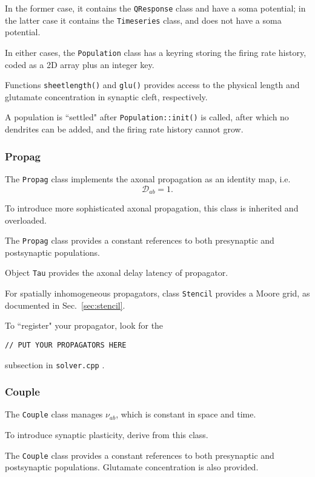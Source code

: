 \documentclass[12pt,a4paper]{article}
\newcommand{\type}[1]{ {\small\small\tt #1} }
\begin{document}
In the former case, it contains the \type{QResponse} class and have a soma potential; in the latter case it contains the \type{Timeseries} class, and does not have a soma potential.

In either cases, the \type{Population} class has a keyring storing the firing rate history, coded as a 2D array plus an integer key.

Functions \type{sheetlength()} and \type{glu()} provides access to the physical length and glutamate concentration in synaptic cleft, respectively.

A population is ``settled" after \type{Population::init()} is called, after which no dendrites can be added, and the firing rate history cannot grow.

\subsubsection{Propag}
\label{sec:propag}

The \type{Propag} class implements the axonal propagation as an identity map, i.e.
\[ \mathcal{D}_{ab} = 1. \]

To introduce more sophisticated axonal propagation, this class is inherited and overloaded.

The \type{Propag} class provides a constant references to both presynaptic and postsynaptic populations.

Object \type{Tau} provides the axonal delay latency of propagator.

For spatially inhomogeneous propagators, class \type{Stencil} provides a Moore grid, as documented in Sec.~\ref{sec:stencil}.

To ``register" your propagator, look for the
\begin{lstlisting}
// PUT YOUR PROPAGATORS HERE
\end{lstlisting}
subsection in \type{solver.cpp}.

\subsubsection{Couple}
\label{sec:couple}

The \type{Couple} class manages \(\nu_{ab}\), which is constant in space and time.

To introduce synaptic plasticity, derive from this class.

The \type{Couple} class provides a constant references to both presynaptic and postsynaptic populations. Glutamate concentration is also provided.
\end{document}
